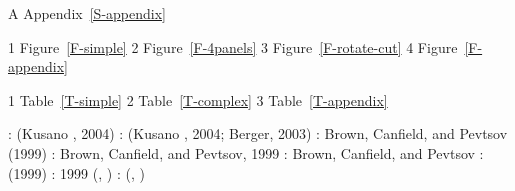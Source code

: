 A Appendix~\ref{S-appendix}
 
 1 Figure~\ref{F-simple}
 2 Figure~\ref{F-4panels}
 3 Figure~\ref{F-rotate-cut}
 4 Figure~\ref{F-appendix}

 1 Table~\ref{T-simple}
 2 Table~\ref{T-complex}
 3 Table~\ref{T-appendix}

\cite{Kusano04}          : (Kusano \etal, 2004)
\cite{Kusano04,Berger03} : (Kusano \etal, 2004; Berger, 2003)
     : Brown, Canfield, and Pevtsov (1999)
       : Brown, Canfield, and Pevtsov, 1999
\citeauthor{Brown99}     : Brown, Canfield, and Pevtsov
      : (1999)
\citeyear{Brown99}       : 1999
(, \citeyear{Berger03}) 
                         : (, \citeyear{Berger03})

